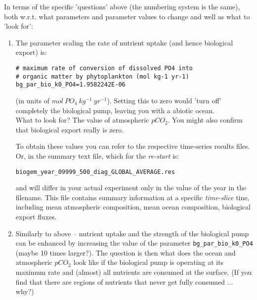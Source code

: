\documentclass[11pt,fleqn]{book} %
\begin{document}
\vspace{2mm}
\noindent In terms of the specific 'questions' above (the numbering system is the same), both w.r.t. what parameters and parameter values to change and well as what to 'look for':

\begin{enumerate}[noitemsep]

\vspace{1mm}
\item The parameter scaling the rate of nutrient uptake (and hence biological export) is:
\vspace{-1mm}\small\begin{verbatim}
# maximum rate of conversion of dissolved PO4 into 
# organic matter by phytoplankton (mol kg-1 yr-1)
bg_par_bio_k0_PO4=1.9582242E-06
\end{verbatim}\normalsize\vspace{-1mm}
(in units of \(mol\:PO_{4} \:kg^{-1} \:yr^{-1}\)). Setting this to zero would 'turn off' completely the biological pump, leaving you with a abiotic ocean.
\\What to look for? The value of atmospheric \(pCO_{2}\). You might also confirm that biological export really is zero.

To obtain these values you can refer to the respective time-series results files. Or, in the summary text file, which for the \textit{re-start} is:
\vspace{-1pt}\small\begin{verbatim}
biogem_year_09999_500_diag_GLOBAL_AVERAGE.res
\end{verbatim}\normalsize\vspace{-1pt}
and will differ in your actual experiment only in the value of the year in the filename. This file contains summary information at a specific \textit{time-slice} tine, including mean atmospheric composition, mean ocean composition, biological export fluxes.

\vspace{1mm}
\item Similarly to above -- nutrient uptake and the strength of the biological pump can be enhanced by increasing the value of the parameter \texttt{bg\_par\_bio\_k0\_PO4} (maybe 10 times larger?).
The question is then what does the ocean and atmospheric \(pCO_{2}\) look like if the biological pump is operating at its maximum rate and (almost) all nutrients are consumed at the surface. (If you find that there are regions of nutrients that never get fully consumed ... why?)


\end{enumerate}
\end{document}
